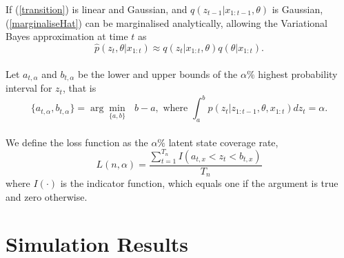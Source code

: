 \documentclass[12pt,a4paper]{article}\usepackage[]{graphicx}\usepackage[]{color}
\begin{document}
If (\ref{transition}) is linear and Gaussian, and  $q(z_{t-1} | x_{1:t-1}, \theta)$ is Gaussian, (\ref{marginaliseHat}) can be marginalised analytically, allowing the Variational Bayes approximation at time $t$ as
\begin{equation}
\label{UVBfilter}
\hat{p}(z_t, \theta | x_{1:t}) \approx q(z_{t} | x_{1:t}, \theta)q(\theta|x_{1:t}).
\end{equation}
\\

Let $a_{t, \alpha}$ and $b_{t, \alpha}$ be the lower and upper bounds of the $\alpha\%$ highest probability interval for $z_t$, that is
\begin{equation}
\label{HPI}
\{a_{t, \alpha}, b_{t, \alpha}\} = \arg \underset{\{a, b\}}{\min}\mbox{ } b - a, \mbox{ where } \int_a^b p(z_t | z_{1:t-1}, \theta, x_{1:t})dz_t = \alpha.
\end{equation}
\\

We define the loss function as the $\alpha\%$ latent state coverage rate, 
\begin{equation}
\label{coverage}
L(n, \alpha) = \frac{\sum_{t=1}^{T_n} I(a_{t, x} < z_t < b_{t, x})}{T_n}
\end{equation}
where $I(\cdot)$ is the indicator function, which equals one if the argument is true and zero otherwise.

\section{Simulation Results}




\end{document}
